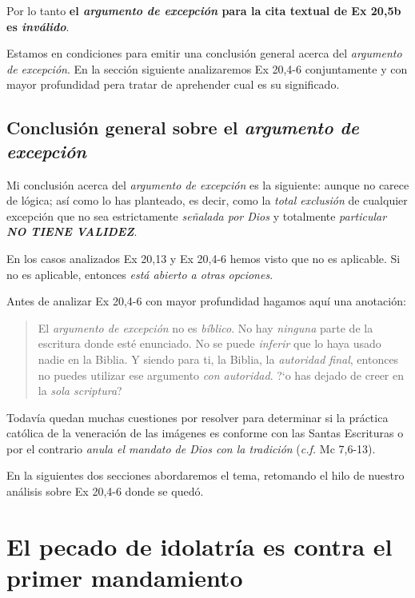 \documentclass{article}
\begin{document}
Por lo tanto \textbf{el \emph{argumento de excepci\'on} para la cita textual de Ex 20,5b es \emph{inv\'alido}}.

Estamos en condiciones para emitir una conclusi\'on general acerca del \emph{argumento de excepci\'on}. En la secci\'on siguiente analizaremos Ex 20,4-6 conjuntamente y con mayor profundidad pera tratar de aprehender cual es su significado.

\subsection{Conclusi\'on general sobre el \emph{argumento de excepci\'on}}

Mi conclusi\'on acerca del \emph{argumento de excepci\'on} es la siguiente: aunque no carece de l\'ogica; as\'{i} como lo has planteado, es decir, como la \emph{total exclusi\'on} de cualquier excepci\'on que no sea estrictamente \emph{se\~nalada por Dios} y totalmente \emph{particular} \textbf{\emph{NO TIENE VALIDEZ}}.

En los casos analizados Ex 20,13 y Ex 20,4-6 hemos visto que no es aplicable. Si no es aplicable, entonces \emph{est\'a abierto a otras opciones}.

Antes de analizar Ex 20,4-6 con mayor profundidad hagamos aqu\'{i} una anotaci\'on:

\begin{quote}
El \emph{argumento de excepci\'on} no es \emph{b\'{i}blico}. No hay \emph{ninguna} parte de la escritura donde est\'e enunciado. No se puede \emph{inferir} que lo haya usado nadie en la Biblia. Y siendo para ti, la Biblia, la \emph{autoridad final}, entonces no puedes utilizar ese argumento \emph{con autoridad}. ?`o has dejado de creer en la \emph{sola scriptura}?
\end{quote}

\noindent
Todav\'{i}a quedan muchas cuestiones por resolver para determinar si la pr\'actica cat\'olica de la veneraci\'on de las im\'agenes es conforme con las Santas Escrituras o por el contrario \emph{anula el mandato de Dios con la tradici\'on} (\emph{c.f.} Mc 7,6-13).

En la siguientes dos secciones abordaremos el tema, retomando el hilo de nuestro an\'alisis sobre Ex 20,4-6 donde se qued\'o.

\section{El pecado de idolatr\'{i}a es contra el primer mandamiento}
\end{document}
